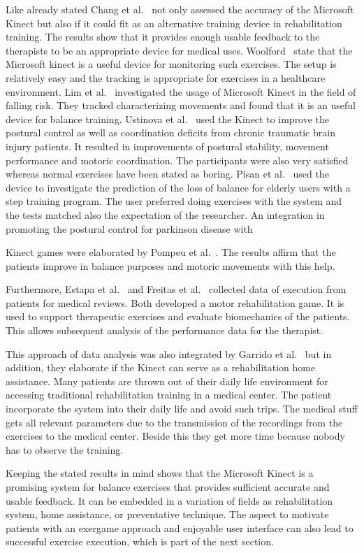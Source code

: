 Like already stated Chang et al.~\cite{Chang2012-hz} not only assessed the accuracy of the Microsoft Kinect but also if it could fit as an alternative training device in rehabilitation training. The results show that it provides enough usable feedback to the therapists to be an appropriate device for medical uses. Woolford~\cite{Woolford2015-ub} state that the Microsoft kinect is a useful device for monitoring such exercises. The setup is relatively easy and the tracking is appropriate for exercises in a healthcare environment. Lim et al.~\cite{Lim2015-pw} investigated the usage of Microsoft Kinect in the field of falling risk. They tracked characterizing movements and found that it is an useful device for balance training. Ustinova et al.~\cite{Ustinova2014-ml} used the Kinect to improve the postural control as well as coordination deficits from chronic traumatic brain injury patients. It resulted in improvements of postural stability, movement performance and motoric coordination. The participants were also very satisfied whereas normal exercises have been stated as boring. Pisan et al.~\cite{Pisan2013-sf} used the device to investigate the prediction of the loss of balance for elderly users with a step training program. The user preferred doing exercises with the system and the tests matched also the expectation of the researcher. An integration in promoting the postural control for parkinson disease with 

Kinect games were elaborated by Pompeu et al.~\cite{Pompeu2014-yl, Pompeu2015-vp}. The results affirm that the patients improve in balance purposes and motoric movements with this help.

Furthermore, Estapa et al.~\cite{Estepa2016-oj} and Freitas et al.~\cite{Freitas2012-ae} collected data of execution from patients for medical reviews. Both developed a motor rehabilitation game. It is used to support therapeutic exercises and evaluate biomechanics of the patients. This allows subsequent analysis of the performance data for the therapist.

This approach of data analysis was also integrated by Garrido et al.~\cite{Garrido2013-zs} but in addition, they elaborate if the Kinect can serve as a rehabilitation home assistance. Many patients are thrown out of their daily life environment for accessing traditional rehabilitation training in a medical center. The patient incorporate the system into their daily life and avoid such trips. The medical stuff gets all relevant parameters due to the transmission of the recordings from the exercises to the medical center. Beside this they get more time because nobody has to observe the training.

Keeping the stated results in mind shows that the Microsoft Kinect is a promising system for balance exercises that provides sufficient accurate and usable feedback. It can be embedded in a variation of fields as rehabilitation system, home assistance, or preventative technique. The aspect to motivate patients with an exergame approach and enjoyable user interface can also lead to successful exercise execution, which is part of the next section.
